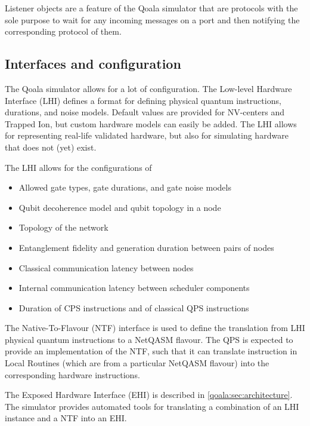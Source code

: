 Listener objects are a feature of the Qoala simulator that are protocols with the sole purpose to wait for any incoming messages on a port and then notifying the corresponding protocol of them.

\subsection{Interfaces and configuration}
The Qoala simulator allows for a lot of configuration.
The Low-level Hardware Interface (LHI) defines a format for defining physical quantum instructions, durations, and noise models.
Default values are provided for NV-centers and Trapped Ion, but custom hardware models can easily be added.
The LHI allows for representing real-life validated hardware, but also for simulating hardware that does not (yet) exist.

The LHI allows for the configurations of
\begin{itemize}
    \item Allowed gate types, gate durations, and gate noise models
    \item Qubit decoherence model and qubit topology in a node
    \item Topology of the network
    \item Entanglement fidelity and generation duration between pairs of nodes
    \item Classical communication latency between nodes
    \item Internal communication latency between scheduler components
    \item Duration of CPS instructions and of classical QPS instructions
\end{itemize}

The Native-To-Flavour (NTF) interface is used to define the translation from LHI physical quantum instructions to a NetQASM flavour.
The QPS is expected to provide an implementation of the NTF, such that it can translate instruction in Local Routines (which are from a particular NetQASM flavour) into the corresponding hardware instructions.

The Exposed Hardware Interface (EHI) is described in \cref{qoala:sec:architecture}.
The simulator provides automated tools for translating a combination of an LHI instance and a NTF into an EHI.

